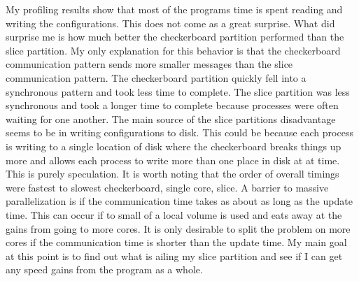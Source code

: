 \documentclass[11pt,a4paper,oneside]{report}
\begin{document}
My profiling results show that most of the programs time is spent reading and writing the configurations.  
This does not come as a great surprise.  
What did surprise me is how much better the checkerboard partition performed than the slice partition.  
My only explanation for this behavior is that the checkerboard communication pattern sends more smaller messages than the slice communication pattern.
The checkerboard partition quickly fell into a synchronous pattern and took less time to complete.  
The slice partition was less synchronous and took a longer time to complete because processes were often waiting for one another.
The main source of the slice partitions disadvantage seems to be in writing configurations to disk.
This could be because each process is writing to a single location of disk where the checkerboard breaks things up more and allows each process to write more than one place in disk at at time.
This is purely speculation.
It is worth noting that the order of overall timings were fastest to slowest checkerboard, single core, slice.
A barrier to massive parallelization is if the communication time takes as about as long as the update time. 
This can occur if to small of a local volume is used and eats away at the gains from going to more cores.
It is only desirable to split the problem on more cores if the communication time is shorter than the update time.
My main goal at this point is to find out what is ailing my slice partition and see if I can get any speed gains from the program as a whole.
\end{document}
